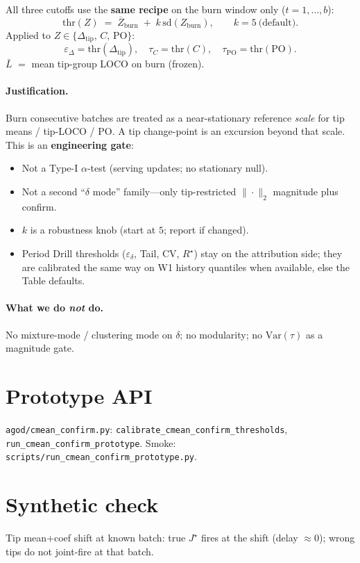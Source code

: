 \documentclass[11pt]{article}
\newcommand{\Dtip}{\Delta_{\mathrm{tip}}}
\newcommand{\Jstar}{J^\star}
\begin{document}
All three cutoffs use the \textbf{same recipe} on the burn window
only ($t=1,\ldots,b$):
\begin{equation}
\label{eq:ksigma}
  \mathrm{thr}(Z)
  \;=\;
  \overline{Z}_{\mathrm{burn}}
  \;+\;
  k\,\mathrm{sd}(Z_{\mathrm{burn}}),
  \qquad k{=}5\ \text{(default)}.
\end{equation}
Applied to $Z\in\{\Dtip,\,C,\,\mathrm{PO}\}$:
\[
  \varepsilon_\Delta=\mathrm{thr}(\Dtip),\quad
  \tau_C=\mathrm{thr}(C),\quad
  \tau_{\mathrm{PO}}=\mathrm{thr}(\mathrm{PO}).
\]
$\bar L$ $=$ mean tip-group LOCO on burn (frozen).

\paragraph{Justification.}
Burn consecutive batches are treated as a near-stationary reference
\emph{scale} for tip means / tip-LOCO / PO. A tip change-point is an
excursion beyond that scale. This is an \textbf{engineering gate}:
\begin{itemize}[leftmargin=*,itemsep=0.25em]
  \item Not a Type-I $\alpha$-test (serving updates; no stationary null).
  \item Not a second ``$\delta$ mode'' family---only tip-restricted
        $\|\cdot\|_2$ magnitude plus confirm.
  \item $k$ is a robustness knob (start at $5$; report if changed).
  \item Period Drill thresholds ($\varepsilon_\delta$, Tail, CV, $R^\star$)
        stay on the attribution side; they are calibrated the same way
        on W1 history quantiles when available, else the Table defaults.
\end{itemize}

\paragraph{What we do \emph{not} do.}
No mixture-mode / clustering mode on $\delta$; no modularity; no
$\mathrm{Var}(\hat\tau)$ as a magnitude gate.

\section{Prototype API}
\texttt{agod/cmean\_confirm.py}:
\texttt{calibrate\_cmean\_confirm\_thresholds},
\texttt{run\_cmean\_confirm\_prototype}.
Smoke:
\texttt{scripts/run\_cmean\_confirm\_prototype.py}.

\section{Synthetic check}
Tip mean+coef shift at known batch: true $\Jstar$ fires at the shift
(delay $\approx 0$); wrong tips do not joint-fire at that batch.
\end{document}
